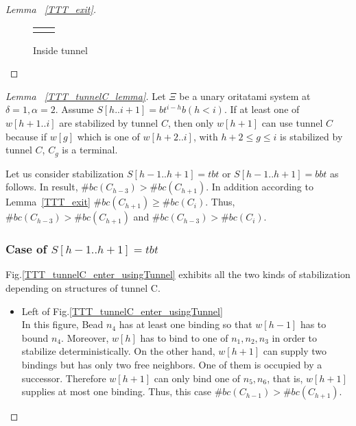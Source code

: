 \begin{proof}[Lemma~ \ref{TTT_exit}]
\begin{figure}
\begin{tabular}{cc}
\begin{minipage}{0.33\hsize}
    \caption{Inside tunnel}
    \label{TTT_inside_tunnel}
    \end{minipage}
 
    \end{tabular}
\end{figure}
\end{proof}

\begin{proof}[Lemma~ \ref{TTT_tunnelC_lemma}]
Let $\Xi$ be a unary oritatami system at $\delta = 1, \alpha = 2$.
Assume $S[h..i+1] = bt^{i-h}b (h<i)$. If at least one of $w[h+1..i]$ are stabilized by tunnel $C$, then only $w[h+1]$ can use tunnel $C$ because if $w[g]$ which is one of $w[h+2..i]$, with $h+2 \leq g \leq i$ is stabilized by tunnel $C$, $C_g$ is a terminal.


Let us consider stabilization $S[h-1..h+1] = tbt$ or $S[h-1..h+1] = bbt$ as follows. In result, $\#bc(C_{h-3}) > \#bc(C_{h+1})$. In addition according to Lemma~\ref{TTT_exit} $\#bc(C_{h+1}) \geq \#bc(C_{i})$. Thus, $\#bc(C_{h-3}) > \#bc(C_{h+1})$ and $\#bc(C_{h-3}) > \#bc(C_{i})$.
\\

\subsubsection{Case of $S[h-1..h+1] = tbt$}
Fig.\ref{TTT_tunnelC_enter_usingTunnel} exhibits all the two kinds of stabilization depending on structures of tunnel C.

\begin{itemize}
\item{Left of Fig.\ref{TTT_tunnelC_enter_usingTunnel}}\\
  In this figure, Bead $n_4$ has at least one binding so that $w[h-1]$ has to bound $n_4$. Moreover, $w[h]$ has to bind to one of $n_1, n_2, n_3$ in order to stabilize deterministically. On the other hand, $w[h+1]$ can supply two bindings but has only two free neighbors. One of them is occupied by a successor. Therefore $w[h+1]$ can only bind one of $n_5, n_6$, that is, $w[h+1]$ supplies at most one binding. Thus, this case $\#bc(C_{h-1}) > \#bc(C_{h+1})$.


\end{itemize}
\end{proof}
